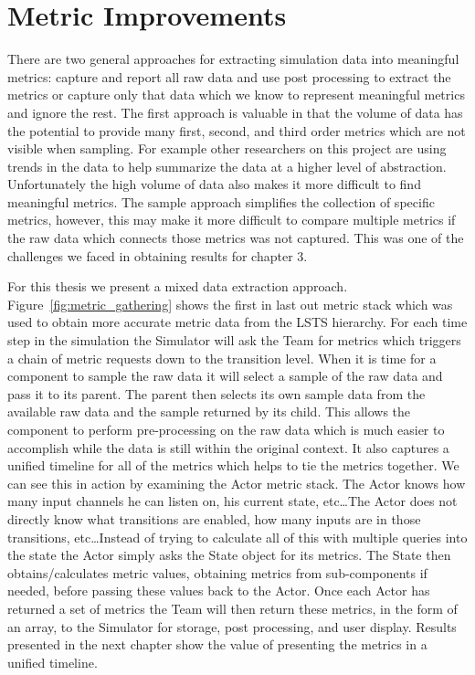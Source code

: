 \chapter{Metric Improvements} \label{ch:metrics}

There are two general approaches for extracting simulation data into meaningful metrics: capture and report all raw data and use post processing to extract the metrics or capture only that data which we know to represent meaningful metrics and ignore the rest.  The first approach is valuable in that the volume of data has the potential to provide many first, second, and third order metrics which are not visible when sampling.  For example other researchers on this project are using trends in the data to help summarize the data at a higher level of abstraction.  Unfortunately the high volume of data also makes it more difficult to find meaningful metrics.  The sample approach simplifies the collection of specific metrics, however, this may make it more difficult to compare multiple metrics if the raw data which connects those metrics was not captured.  This was one of the challenges we faced in obtaining results for chapter 3.

For this thesis we present a mixed data extraction approach.  Figure~\ref{fig:metric_gathering} shows the first in last out metric stack which was used to obtain more accurate metric data from the LSTS hierarchy.  For each time step in the simulation the Simulator will ask the Team for metrics which triggers a chain of metric requests down to the transition level.  When it is time for a component to sample the raw data it will select a sample of the raw data and pass it to its parent.  The parent then selects its own sample data from the available raw data and the sample returned by its child.  This allows the component to perform pre-processing on the raw data which is much easier to accomplish while the data is still within the original context.  It also captures a unified timeline for all of the metrics which helps to tie the metrics together.  We can see this in action by examining the Actor metric stack.  The Actor knows how many input channels he can listen on, his current state, etc\ldots  The Actor does not directly know what transitions are enabled, how many inputs are in those transitions, etc\ldots  Instead of trying to calculate all of this with multiple queries into the state the Actor simply asks the State object for its metrics.  The State then obtains/calculates metric values, obtaining metrics from sub-components if needed, before passing these values back to the Actor.  Once each Actor has returned a set of metrics the Team will then return these metrics, in the form of an array, to the Simulator for storage, post processing, and user display.  Results presented in the next chapter show the value of presenting the metrics in a unified timeline.

